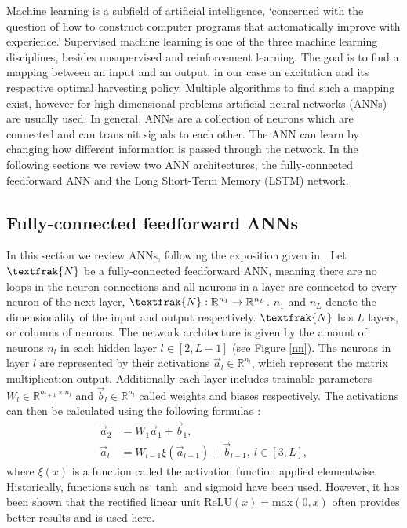 Machine learning is a subfield of artificial intelligence, `concerned with the question of how to construct computer programs that automatically improve with experience.' \cite{Mitchell97}
Supervised machine learning is one of the three machine learning disciplines, besides unsupervised and reinforcement learning.
The goal is to find a mapping between an input and an output, in our case an excitation and its respective optimal harvesting policy.
Multiple algorithms to find such a mapping exist, however for high dimensional problems artificial neural networks (ANNs) are usually used.
In general, ANNs are a collection of neurons which are connected and can transmit signals to each other.
The ANN can learn by changing how different information is passed through the network.
In the following sections we review two ANN architectures, the fully-connected feedforward ANN and the Long Short-Term Memory (LSTM) network.

\subsection{Fully-connected feedforward ANNs}
In this section we review ANNs, following the exposition given in \cite{lu2020dying}.
Let $\textfrak{N}$ be a fully-connected feedforward ANN, meaning there are no loops in the neuron connections and all neurons in a layer are connected to every neuron of the next layer, $\textfrak{N}: \mathbb{R}^{n_1} \to \mathbb{R}^{n_L}$. $n_1$ and $n_L$ denote the dimensionality of the input and output respectively. 
$\textfrak{N}$ has $L$ layers, or columns of neurons.
The network architecture is given by the amount of neurons $n_l$ in each hidden layer $l \in [2, L - 1]$ (see Figure \ref{nn}).
The neurons in layer $l$ are represented by their activations $\vec{a}_l \in \mathbb{R}^{n_l}$, which represent the matrix multiplication output. Additionally each layer includes trainable parameters $W_l \in \mathbb{R}^{n_{l+1} \times n_{l}}$ and $\vec{b}_l \in \mathbb{R}^{n_l}$ called weights and biases respectively.
The activations can then be calculated using the following formulae \cite{TN_libero_mab2)53517}:
\begin{align*}
	\vec{a}_2 & = W_1 \vec{a}_1 + \vec{b}_1, \\
	\vec{a}_l & = W_{l-1} \xi(\vec{a}_{l-1}) + \vec{b}_{l-1}, \ l \in [3, L],
\end{align*}
where $\xi(x)$ is a function called the activation function applied elementwise. Historically, functions such as $\tanh$ and sigmoid have been used. However, it has been shown \cite{Maas2013RectifierNI, krizhevsky} that the rectified linear unit $\mathrm{ReLU}(x) = \mathrm{max}(0, x)$ often provides better results and is used here.

